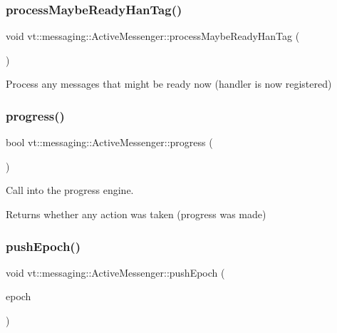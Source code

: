 \subsubsection{\texorpdfstring{process\+Maybe\+Ready\+Han\+Tag()}{processMaybeReadyHanTag()}}
{\footnotesize\ttfamily void vt\+::messaging\+::\+Active\+Messenger\+::process\+Maybe\+Ready\+Han\+Tag (\begin{DoxyParamCaption}{ }\end{DoxyParamCaption})}



Process any messages that might be ready now (handler is now registered) 

\mbox{\label{structvt_1_1messaging_1_1_active_messenger_ae7cac91699945ad8bf3f36d07628116e}} 
\subsubsection{\texorpdfstring{progress()}{progress()}}
{\footnotesize\ttfamily bool vt\+::messaging\+::\+Active\+Messenger\+::progress (\begin{DoxyParamCaption}{ }\end{DoxyParamCaption})}



Call into the progress engine. 

\begin{DoxyReturn}{Returns}
whether any action was taken (progress was made) 
\end{DoxyReturn}
\mbox{\label{structvt_1_1messaging_1_1_active_messenger_ac60a61b85392a5c40d2334919981963a}} 
\subsubsection{\texorpdfstring{push\+Epoch()}{pushEpoch()}}
{\footnotesize\ttfamily void vt\+::messaging\+::\+Active\+Messenger\+::push\+Epoch (\begin{DoxyParamCaption}\item[{\hyperlink{namespacevt_a985a5adf291c34a3ca263b3378388236}{Epoch\+Type} const \&}]{epoch }\end{DoxyParamCaption})\hspace{0.3cm}{\ttfamily [inline]}}




